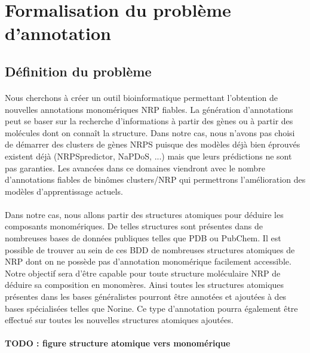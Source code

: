 \documentclass[12pt,french,twoside]{report}
\begin{document}
\section{Formalisation du problème d'annotation}

\subsection{Définition du problème}

\paragraph{}Nous cherchons à créer un outil bioinformatique permettant l'obtention de nouvelles annotations monomériques NRP fiables.
La génération d'annotations peut se baser sur la recherche d'informations à partir des gènes ou à partir des molécules dont on connaît la structure.
Dans notre cas, nous n'avons pas choisi de démarrer des clusters de gènes NRPS puisque des modèles déjà bien éprouvés existent déjà (NRPSpredictor, NaPDoS, ...) mais que leurs prédictions ne sont pas garanties.
Les avancées dans ce domaines viendront avec le nombre d'annotations fiables de binômes clusters/NRP qui permettrons l'amélioration des modèles d'apprentissage actuels.

\paragraph{}Dans notre cas, nous allons partir des structures atomiques pour déduire les composants monomériques.
De telles structures sont présentes dans de nombreuses bases de données publiques telles que PDB ou PubChem.
Il est possible de trouver au sein de ces BDD de nombreuses structures atomiques de NRP dont on ne possède pas d'annotation monomérique facilement accessible.
Notre objectif sera d'être capable pour toute structure moléculaire NRP de déduire sa composition en monomères.
Ainsi toutes les structures atomiques présentes dans les bases généralistes pourront être annotées et ajoutées à des bases spécialisées telles que Norine.
Ce type d'annotation pourra également être effectué sur toutes les nouvelles structures atomiques ajoutées.

\paragraph{TODO : figure structure atomique vers monomérique}
\end{document}
